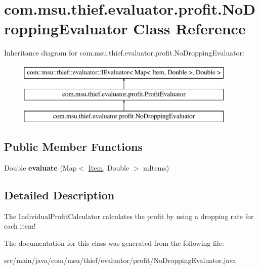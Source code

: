 \hypertarget{classcom_1_1msu_1_1thief_1_1evaluator_1_1profit_1_1NoDroppingEvaluator}{\section{com.\-msu.\-thief.\-evaluator.\-profit.\-No\-Dropping\-Evaluator Class Reference}
\label{classcom_1_1msu_1_1thief_1_1evaluator_1_1profit_1_1NoDroppingEvaluator}
}
Inheritance diagram for com.\-msu.\-thief.\-evaluator.\-profit.\-No\-Dropping\-Evaluator\-:\begin{figure}[H]
\begin{center}
\leavevmode
\includegraphics[height=3.000000cm]{classcom_1_1msu_1_1thief_1_1evaluator_1_1profit_1_1NoDroppingEvaluator}
\end{center}
\end{figure}
\subsection*{Public Member Functions}
\begin{DoxyCompactItemize}
\item 
\hypertarget{classcom_1_1msu_1_1thief_1_1evaluator_1_1profit_1_1NoDroppingEvaluator_a3fc1bbaf97937ebb2c8692147473773b}{Double {\bfseries evaluate} (Map$<$ \hyperlink{classcom_1_1msu_1_1thief_1_1model_1_1Item}{Item}, Double $>$ m\-Items)}\label{classcom_1_1msu_1_1thief_1_1evaluator_1_1profit_1_1NoDroppingEvaluator_a3fc1bbaf97937ebb2c8692147473773b}

\end{DoxyCompactItemize}


\subsection{Detailed Description}
The Individual\-Profit\-Calculator calculates the profit by using a dropping rate for each item! 

The documentation for this class was generated from the following file\-:\begin{DoxyCompactItemize}
\item 
src/main/java/com/msu/thief/evaluator/profit/No\-Dropping\-Evaluator.\-java\end{DoxyCompactItemize}
